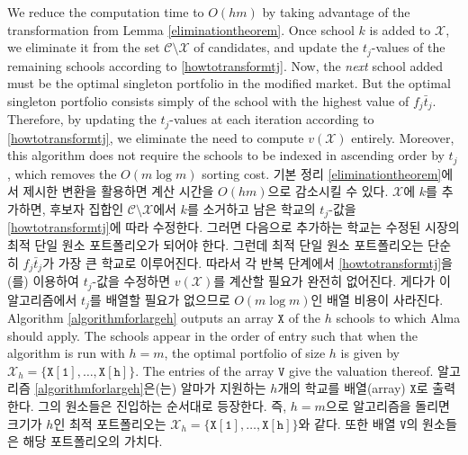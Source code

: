 \documentclass[11pt]{article} %
\theoremstyle{definition}
\theoremstyle{definition}
\begin{document}
\ifen 
We reduce the computation time to $O(hm)$ by taking advantage of the transformation from Lemma \ref{eliminationtheorem}. Once school $k$ is added to $\mathcal{X}$, we eliminate it from the set $\mathcal{C}\setminus \mathcal{X}$ of candidates, and update the $t_j$-values of the remaining schools according to \eqref{howtotransformtj}. Now, the \emph{next} school added must be the optimal singleton portfolio in the modified market. But the optimal singleton portfolio consists simply of the school with the highest value of $f_j \bar t_j$. Therefore, by updating the $t_j$-values at each iteration according to \eqref{howtotransformtj}, we eliminate the need to compute $v(\mathcal{X})$ entirely. Moreover, this algorithm does not require the schools to be indexed in ascending order by $t_j$, which removes the $O(m\log m)$ sorting cost.
\else
기본 정리 \ref{eliminationtheorem}에서 제시한 변환을 활용하면 계산 시간을 $O(hm)$으로 감소시킬 수 있다. $\mathcal{X}$에 $k$를 추가하면, 후보자 집합인 $\mathcal{C}\setminus \mathcal{X}$에서 $k$를 소거하고 남은 학교의 $t_j$-값을 \eqref{howtotransformtj}에 따라 수정한다. 그러면 다음으로 추가하는 학교는 수정된 시장의 최적 단일 원소 포트폴리오가 되어야 한다. 그런데 최적 단일 원소 포트폴리오는 단순히 $f_j \bar t_j$가 가장 큰 학교로 이루어진다. 따라서 각 반복 단계에서 \eqref{howtotransformtj}을(를) 이용하여 $t_j$-값을 수정하면 $v(\mathcal{X})$를 계산할 필요가 완전히 없어진다. 게다가 이 알고리즘에서 $t_j$를 배열할 필요가 없으므로 $O(m\log m)$인 배열 비용이 사라진다. \fi
\ifen
Algorithm \ref{algorithmforlargeh} outputs an array $\mathtt{X}$ of the $h$ schools to which Alma should apply. The schools appear in the order of entry such that when the algorithm is run with $h=m$, the optimal portfolio of size $h$ is given by $\mathcal{X}_h = \{\mathtt{X[1]}, \dots, \mathtt{X[h]}\}$. The entries of the array $\mathtt{V}$ give the valuation thereof. 
\else
알고리즘 \ref{algorithmforlargeh}은(는) 알마가 지원하는 $h$개의 학교를 배열(array) $\mathtt{X}$로 출력한다. 그의 원소들은 진입하는 순서대로 등장한다. 즉, $h=m$으로 알고리즘을 돌리면 크기가 $h$인 최적 포트폴리오는 $\mathcal{X}_h = \{\mathtt{X[1]}, \dots, \mathtt{X[h]}\}$와 같다. 또한 배열 $\mathtt{V}$의 원소들은 해당 포트폴리오의 가치다. \fi
\end{document}
